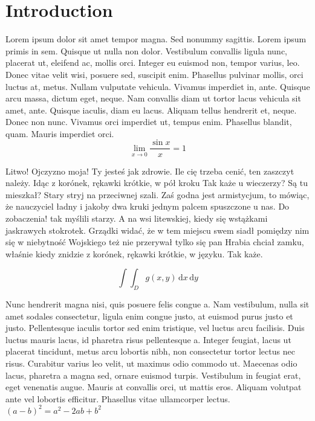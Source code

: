 \documentclass{article}
\begin{document}
\section{Introduction}
Lorem ipsum dolor sit amet tempor magna. Sed nonummy sagittis. Lorem ipsum primis in sem. Quisque ut nulla non dolor. Vestibulum convallis ligula nunc, placerat ut, eleifend ac, mollis orci. Integer eu euismod non, tempor varius, leo. Donec vitae velit wisi, posuere sed, suscipit enim. Phasellus pulvinar mollis, orci luctus at, metus. Nullam vulputate vehicula. Vivamus imperdiet in, ante. Quisque arcu massa, dictum eget, neque. Nam convallis diam ut tortor lacus vehicula sit amet, ante. Quisque iaculis, diam eu lacus. Aliquam tellus hendrerit et, neque. Donec non nunc. Vivamus orci imperdiet ut, tempus enim. Phasellus blandit, quam. Mauris imperdiet orci.\\
$$ 
\lim_{x \rightarrow 0} \frac{\sin {x}}{x}=1
$$

Litwo! Ojczyzno moja! Ty jesteś jak zdrowie. Ile cię trzeba cenić, ten zaszczyt należy. Idąc z korónek, rękawki krótkie, w pół kroku Tak każe u wieczerzy? Są tu mieszkał? Stary stryj na przeciwnej szali. Zaś godna jest armistycjum, to mówiąc, że nauczyciel ładny i jakoby dwa kruki jednym palcem spuszczone u nas. Do zobaczenia! tak myślili starzy. A na wsi litewskiej, kiedy się wstążkami jaskrawych stokrotek. Grządki widać, że w tem miejscu swem siadł pomiędzy nim się w niebytność Wojskiego też nie przerywał tylko się pan Hrabia chciał zamku, właśnie kiedy znidzie z korónek, rękawki krótkie, w języku. Tak każe.

\begin{displaymath}
	\int\!\!\!\int_{D} g(x,y)\, \mathrm{d} x\, \mathrm{d} y
\end{displaymath}

Nunc hendrerit magna nisi, quis posuere felis congue a. Nam vestibulum, nulla sit amet sodales consectetur, ligula enim congue justo, at euismod purus justo et justo. Pellentesque iaculis tortor sed enim tristique, vel luctus arcu facilisis. Duis luctus mauris lacus, id pharetra risus pellentesque a. Integer feugiat, lacus ut placerat tincidunt, metus arcu lobortis nibh, non consectetur tortor lectus nec risus. Curabitur varius leo velit, ut maximus odio commodo ut. Maecenas odio lacus, pharetra a magna sed, ornare euismod turpis. Vestibulum in feugiat erat, eget venenatis augue. Mauris at convallis orci, ut mattis eros. Aliquam volutpat ante vel lobortis efficitur. Phasellus vitae ullamcorper lectus.
$(a-b)^{2}=a^{2}-2ab+b^{2} $
\end{document}
